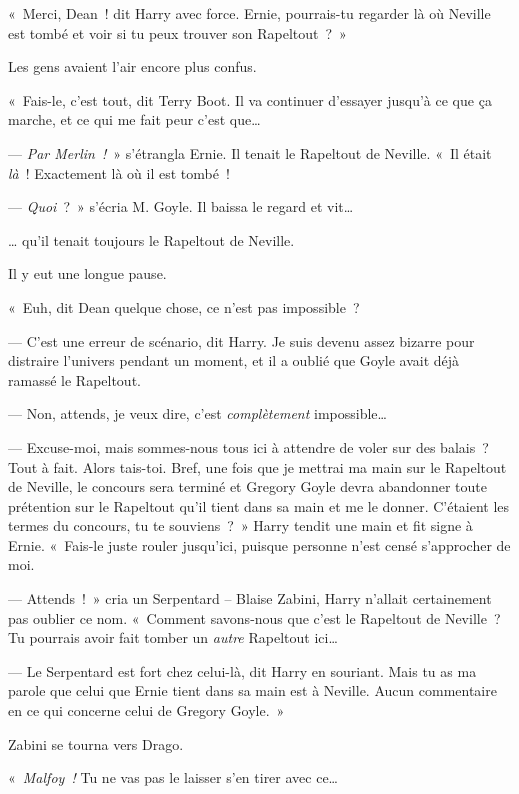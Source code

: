 «~Merci, Dean~! dit Harry avec force. Ernie, pourrais-tu regarder là où Neville est tombé et voir si tu peux trouver son Rapeltout~?~»

Les gens avaient l'air encore plus confus.

«~Fais-le, c'est tout, dit Terry Boot. Il va continuer d'essayer jusqu'à ce que ça marche, et ce qui me fait peur c'est que…

--- \emph{Par Merlin~!}~» s'étrangla Ernie. Il tenait le Rapeltout de Neville. «~Il était \emph{là}~! Exactement là où il est tombé~!

--- \emph{Quoi}~?~» s'écria M. Goyle. Il baissa le regard et vit…

… qu'il tenait toujours le Rapeltout de Neville.

Il y eut une longue pause.

«~Euh, dit Dean quelque chose, ce n'est pas impossible~?

--- C'est une erreur de scénario, dit Harry. Je suis devenu assez bizarre pour distraire l'univers pendant un moment, et il a oublié que Goyle avait déjà ramassé le Rapeltout.

--- Non, attends, je veux dire, c'est \emph{complètement} impossible…

--- Excuse-moi, mais sommes-nous tous ici à attendre de voler sur des balais~? Tout à fait. Alors tais-toi. Bref, une fois que je mettrai ma main sur le Rapeltout de Neville, le concours sera terminé et Gregory Goyle devra abandonner toute prétention sur le Rapeltout qu'il tient dans sa main et me le donner. C'étaient les termes du concours, tu te souviens~?~» Harry tendit une main et fit signe à Ernie. «~Fais-le juste rouler jusqu'ici, puisque personne n'est censé s'approcher de moi.

--- Attends~!~» cria un Serpentard -- Blaise Zabini, Harry n'allait certainement pas oublier ce nom. «~Comment savons-nous que c'est le Rapeltout de Neville~? Tu pourrais avoir fait tomber un \emph{autre} Rapeltout ici…

--- Le Serpentard est fort chez celui-là\footnotemark, dit Harry en souriant. Mais tu as ma parole que celui que Ernie tient dans sa main est à Neville. Aucun commentaire en ce qui concerne celui de Gregory Goyle.~»

Zabini se tourna vers Drago.

«~\emph{Malfoy~!} Tu ne vas pas le laisser s'en tirer avec ce…

